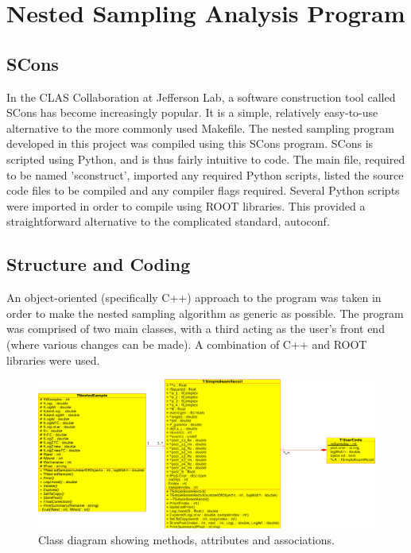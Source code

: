 \documentclass[a4paper,12pt]{article}
\begin{document}

\newpage

\section{Nested Sampling Analysis Program}
\subsection{SCons}
In the CLAS Collaboration at Jefferson Lab, a software construction tool called SCons \cite{scons} has become increasingly popular.  It is a simple, relatively easy-to-use alternative to the more commonly used Makefile.  The nested sampling program developed in this project was compiled using this SCons program.  SCons is scripted using Python, and is thus fairly intuitive to code.  The main file, required to be named 'sconstruct', imported any required Python scripts, listed the source code files to be compiled and any compiler flags required. Several Python scripts were imported in order to compile using ROOT libraries.  This provided a straightforward alternative to the complicated standard, autoconf.


 
\subsection{Structure and Coding}
An object-oriented (specifically C++) approach to the program was taken in order to make the nested sampling algorithm as generic as possible.  The program was comprised of two main classes, with a third acting as the user's front end (where various changes can be made). A combination of C++ and ROOT libraries were used.  
\newline

\begin{figure}[!h]
 \begin{center}
  \includegraphics[scale=0.5]{class_diagram.eps}
  \caption{Class diagram showing methods, attributes and associations.}
 \end{center}
\end{figure}
\end{document}

